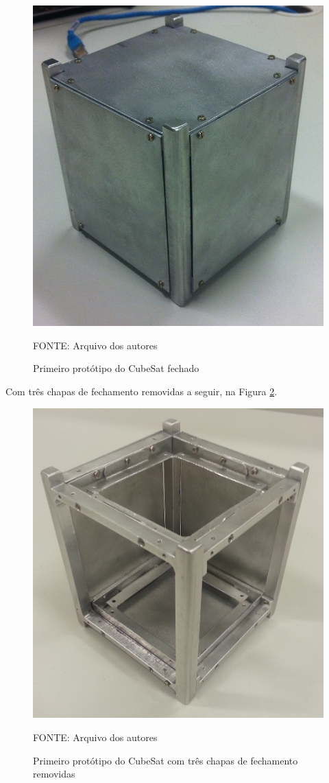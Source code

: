 \documentclass[
	12pt,				%
	openany,			%
	twoside,			%
	a4paper,			%
	english,			%
	french,				%
	spanish,			%
	brazil,				%
	oldfontcommands
	]{abntex2}
\begin{document}
\begin{figure}[ht]
	\caption{Primeiro protótipo do CubeSat fechado}
	\centering
	\includegraphics[width=0.5\linewidth]{./figs/PrototypeOne_Full}
	
	\begin{small}
		FONTE: Arquivo dos autores
	\end{small}
	\label{fig:ProtooneF}
\end{figure}

\newpage

Com três chapas de fechamento removidas a seguir, na Figura \ref{fig:Protoone}.


\begin{figure}[ht]
	\caption{Primeiro protótipo do CubeSat com três chapas de fechamento removidas}
	\centering
	\includegraphics[width=0.5\linewidth]{./figs/PrototypeOne}
	
	\begin{small}
		FONTE: Arquivo dos autores
	\end{small}
	\label{fig:Protoone}
\end{figure}
\end{document}

